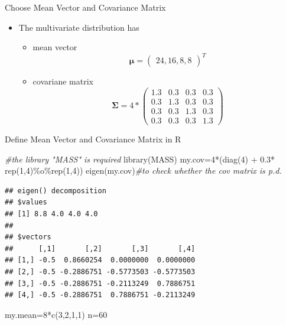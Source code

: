 \documentclass[
  ignorenonframetext,
]{beamer}
\newenvironment{Shaded}{\begin{snugshade}}{\end{snugshade}}
\newcommand{\CommentTok}[1]{\textcolor[rgb]{0.56,0.35,0.01}{\textit{#1}}}
\newcommand{\DecValTok}[1]{\textcolor[rgb]{0.00,0.00,0.81}{#1}}
\newcommand{\FloatTok}[1]{\textcolor[rgb]{0.00,0.00,0.81}{#1}}
\newcommand{\FunctionTok}[1]{\textcolor[rgb]{0.00,0.00,0.00}{#1}}
\newcommand{\NormalTok}[1]{#1}
\newcommand{\OtherTok}[1]{\textcolor[rgb]{0.56,0.35,0.01}{#1}}
\newcommand{\SpecialCharTok}[1]{\textcolor[rgb]{0.00,0.00,0.00}{#1}}
\providecommand{\tightlist}{%
  \setlength{\itemsep}{0pt}\setlength{\parskip}{0pt}}
\begin{document}
\begin{frame}{Choose Mean Vector and Covariance Matrix}
\protect\hypertarget{choose-mean-vector-and-covariance-matrix}{}
\begin{itemize}
\tightlist
\item
  The multivariate distribution has

  \begin{itemize}
  \tightlist
  \item
    mean vector
    \[\boldsymbol \mu=\begin{pmatrix}24, 16, 8, 8\end{pmatrix}^T\]
  \item
    covariane matrix \[\boldsymbol \Sigma=4* \begin{pmatrix}
    1.3 & 0.3 & 0.3 & 0.3\\
    0.3 & 1.3 & 0.3 & 0.3\\
    0.3 & 0.3 & 1.3 & 0.3\\
    0.3 & 0.3 & 0.3 & 1.3
    \end{pmatrix}\]
  \end{itemize}
\end{itemize}
\end{frame}

\begin{frame}[fragile]{Define Mean Vector and Covariance Matrix in R}
\protect\hypertarget{define-mean-vector-and-covariance-matrix-in-r}{}
\begin{Shaded}
\begin{Highlighting}[]
\CommentTok{\#the library "MASS" is required}
\FunctionTok{library}\NormalTok{(MASS)}
\NormalTok{my.cov}\OtherTok{=}\DecValTok{4}\SpecialCharTok{*}\NormalTok{(}\FunctionTok{diag}\NormalTok{(}\DecValTok{4}\NormalTok{) }\SpecialCharTok{+} \FloatTok{0.3}\SpecialCharTok{*} \FunctionTok{rep}\NormalTok{(}\DecValTok{1}\NormalTok{,}\DecValTok{4}\NormalTok{)}\SpecialCharTok{\%o\%}\FunctionTok{rep}\NormalTok{(}\DecValTok{1}\NormalTok{,}\DecValTok{4}\NormalTok{))}
\FunctionTok{eigen}\NormalTok{(my.cov)}\CommentTok{\#to check whether the cov matrix is p.d.}
\end{Highlighting}
\end{Shaded}

\begin{verbatim}
## eigen() decomposition
## $values
## [1] 8.8 4.0 4.0 4.0
## 
## $vectors
##      [,1]       [,2]       [,3]       [,4]
## [1,] -0.5  0.8660254  0.0000000  0.0000000
## [2,] -0.5 -0.2886751 -0.5773503 -0.5773503
## [3,] -0.5 -0.2886751 -0.2113249  0.7886751
## [4,] -0.5 -0.2886751  0.7886751 -0.2113249
\end{verbatim}

\begin{Shaded}
\begin{Highlighting}[]
\NormalTok{my.mean}\OtherTok{=}\DecValTok{8}\SpecialCharTok{*}\FunctionTok{c}\NormalTok{(}\DecValTok{3}\NormalTok{,}\DecValTok{2}\NormalTok{,}\DecValTok{1}\NormalTok{,}\DecValTok{1}\NormalTok{)}
\NormalTok{n}\OtherTok{=}\DecValTok{60}
\end{Highlighting}
\end{Shaded}
\end{frame}
\end{document}
